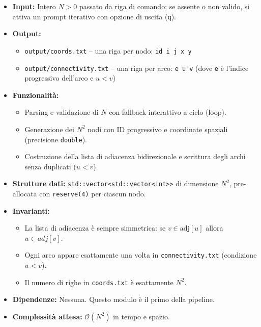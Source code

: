 \documentclass[a4paper,12pt]{article}
\begin{document}
\begin{itemize}
  \item \textbf{Input:} Intero $N > 0$ passato da riga di comando; se assente o non valido, si attiva un prompt iterativo con opzione di uscita (\texttt{q}).
  \item \textbf{Output:}
    \begin{itemize}
      \item \texttt{output/coords.txt} -- una riga per nodo: \texttt{id i j x y}
      \item \texttt{output/connectivity.txt} -- una riga per arco: \texttt{e u v} (dove \texttt{e} è l'indice progressivo dell'arco e $u < v$)
    \end{itemize}
  \item \textbf{Funzionalità:}
    \begin{itemize}
      \item Parsing e validazione di $N$ con fallback interattivo a ciclo (loop).
      \item Generazione dei $N^2$ nodi con ID progressivo e coordinate spaziali (precisione \texttt{double}).
      \item Costruzione della lista di adiacenza bidirezionale e scrittura degli archi senza duplicati ($u < v$).
    \end{itemize}
  \item \textbf{Strutture dati:} \texttt{std::vector<std::vector<int>>} di dimensione $N^2$, pre-allocata con \texttt{reserve(4)} per ciascun nodo.
  \item \textbf{Invarianti:}
    \begin{itemize}
      \item La lista di adiacenza è sempre simmetrica: se $v \in \text{adj}[u]$ allora $u \in \textit{adj}[v]$.
      \item Ogni arco appare esattamente una volta in \texttt{connectivity.txt} (condizione $u < v$).
      \item Il numero di righe in \texttt{coords.txt} è esattamente $N^2$.
    \end{itemize}
  \item \textbf{Dipendenze:} Nessuna. Questo modulo è il primo della pipeline.
  \item \textbf{Complessità attesa:} $\mathcal{O}(N^2)$ in tempo e spazio.
\end{itemize}
\end{document}
